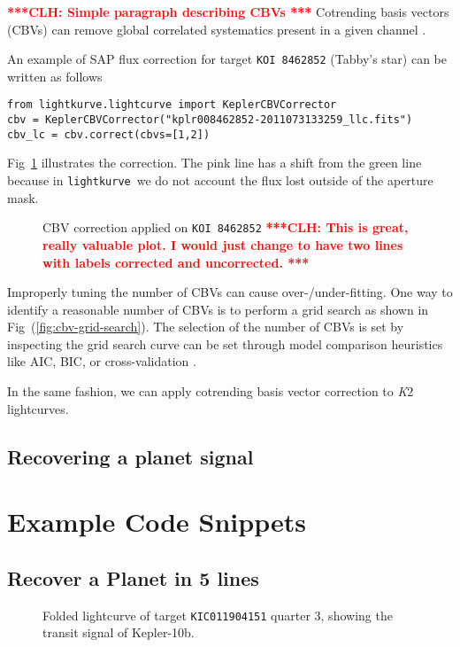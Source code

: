 \documentclass[twocolumn]{aastex62}
\newcommand{\ktwo}{{\it K$\mathit{2}$}}
\newcommand{\lightkurve}{\texttt{lightkurve}}
\newcommand{\clh}[1]{\textcolor{red}{ \textbf{***CLH: #1 ***}}}
\begin{document}
        \clh{Simple paragraph describing CBVs}
        Cotrending basis vectors (CBVs) can remove global correlated
        systematics present in a given channel \cite{smith2012}.

        An example of SAP flux correction for target \texttt{KOI 8462852}
        (Tabby's star) can be written as follows
\begin{verbatim}
from lightkurve.lightcurve import KeplerCBVCorrector
cbv = KeplerCBVCorrector("kplr008462852-2011073133259_llc.fits")
cbv_lc = cbv.correct(cbvs=[1,2])
\end{verbatim}

        Fig~\ref{fig:cbv-correction} illustrates the correction. The pink line has a shift from
        the green line because in \lightkurve~we do not account the flux lost outside of the aperture mask.

        \begin{figure}[!htb]
            \centering
            \caption{CBV correction applied on \texttt{KOI 8462852}
            \clh{This is great, really valuable plot. I would just change to have two lines with labels corrected and uncorrected.}}
            \label{fig:cbv-correction}
        \end{figure}


        Improperly tuning the number of CBVs can cause over-/under-fitting. One
        way to identify a reasonable number of CBVs is to perform a grid search
        as shown in Fig~(\ref{fig:cbv-grid-search}). The selection of the number of CBVs is set by inspecting the
        grid search curve can be set through model comparison heuristics like AIC, BIC,
        or cross-validation \cite{ivezi2014}.

        In the same fashion, we can apply cotrending basis vector correction to
        \ktwo lightcurves.


\subsection{Recovering a planet signal}




\section{Example Code Snippets}

\subsection{Recover a Planet in 5 lines}
\begin{figure}
\caption{Folded lightcurve of target \texttt{KIC011904151} quarter 3, showing the
            transit signal of Kepler-10b.
\label{fig:fold-method}}
\end{figure}
\end{document}

